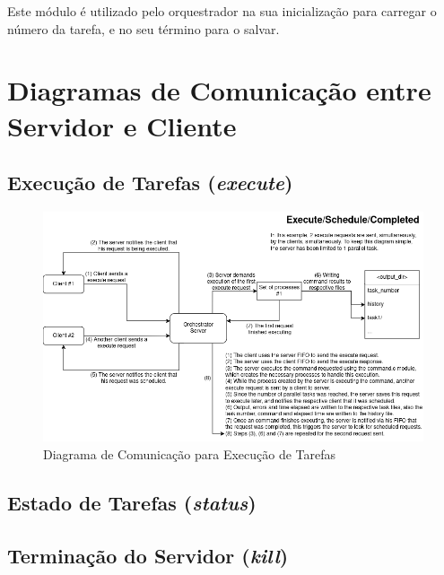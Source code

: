 \documentclass[a4paper,11pt]{scrreprt}
\begin{document}
        Este módulo é utilizado pelo orquestrador na sua inicialização para carregar o número da tarefa, e no seu término para o salvar.

    \clearpage
    \section{Diagramas de Comunicação entre Servidor e Cliente}
        \subsection{Execução de Tarefas (\textit{execute})}
                \begin{figure}[!ht]
                    \centering
                    \includegraphics[width=\textwidth]{diagrams/execute_schedule.png}
                    \caption{Diagrama de Comunicação para Execução de Tarefas}
                    \label{fig:3.1}
                \end{figure}
        \subsection{Estado de Tarefas (\textit{status})}
        \subsection{Terminação do Servidor (\textit{kill})}
\end{document}
